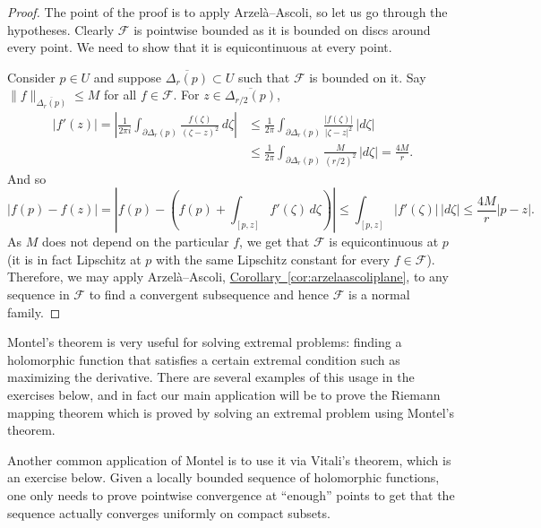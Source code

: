 \documentclass[12pt,openany]{book}
\newcommand{\sabs}[1]{\lvert {#1} \rvert}
\newcommand{\snorm}[1]{\lVert {#1} \rVert}
\newcommand{\abs}[1]{\left\lvert {#1} \right\rvert}
\newcommand{\sF}{{\mathscr{F}}}
\newcommand{\myquote}[1]{``#1''}
\theoremstyle{plain}
\theoremstyle{remark}
\theoremstyle{definition}
\theoremstyle{exercise}
\theoremstyle{example}
\newcommand{\corref}[1]{\hyperref[#1]{Corollary~\ref*{#1}}}
\begin{document}
\begin{proof}
The point of the proof is to apply Arzel\`a--Ascoli, so let us go through
the hypotheses.
Clearly $\sF$ is pointwise bounded as it is bounded on discs around
every point.
We need to show that it is equicontinuous at every point.

Consider $p \in U$ and suppose $\overline{\Delta_r(p)} \subset U$
such that $\sF$ is bounded on it.
Say $\snorm{f}_{\overline{\Delta_r(p)}} \leq M$ for all $f \in \sF$.
For $z \in \overline{\Delta_{r/2}(p)}$,
\begin{equation*}
\begin{split}
\abs{f'(z)}
=
\abs{
\frac{1}{2\pi i}
\int_{\partial \Delta_r(p)}
\frac{f(\zeta)}{{(\zeta-z)}^2} \, d\zeta
}
& \leq
\frac{1}{2\pi}
\int_{\partial \Delta_r(p)}
\frac{\sabs{f(\zeta)}}{\sabs{\zeta-z}^2} \, \sabs{d\zeta}
\\
& \leq
\frac{1}{2\pi}
\int_{\partial \Delta_r(p)}
\frac{M}{{(r/2)}^2} \, \sabs{d\zeta}
=
\frac{4 M}{r}.
\end{split}
\end{equation*}
And so
\begin{equation*}
\abs{f(p)-f(z)}
=
\abs{
f(p)
-
\left(
f(p) + \int_{[p,z]} f'(\zeta) \, d\zeta
\right)
}
\leq
\int_{[p,z]} \abs{f'(\zeta)} \, \sabs{d\zeta}
\leq
\frac{4 M}{r} \sabs{p-z} .
\end{equation*}
As $M$ does not depend on the particular $f$, we get that $\sF$ is
equicontinuous at $p$ (it is in fact Lipschitz at $p$ with the same
Lipschitz constant for every $f \in \sF$).
Therefore, we may apply Arzel\`a--Ascoli, 
\corref{cor:arzelaascoliplane}, to any sequence in $\sF$
to find a convergent subsequence and hence $\sF$ is a normal family.
\end{proof}

Montel's theorem is very useful for solving extremal problems: 
finding a holomorphic function that satisfies a certain extremal condition
such as maximizing the derivative.  There are several examples of this
usage in the exercises below, and in fact our main application will be to
prove the Riemann mapping theorem which is proved by solving an extremal
problem using Montel's theorem.

Another common application of Montel is to use it via Vitali's theorem, which is
an exercise below.  Given a locally bounded sequence of holomorphic
functions, one only needs to prove pointwise convergence at \myquote{enough}
points to get that the sequence actually converges uniformly on compact subsets.
\end{document}
